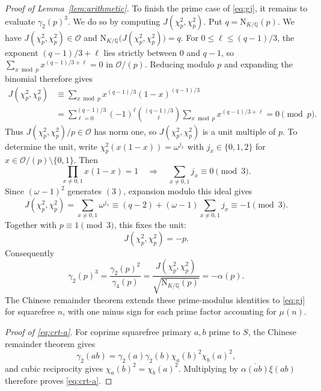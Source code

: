 \documentclass[11pt,a4paper]{article}
\numberwithin{equation}{section}
\numberwithin{figure}{section}
\theoremstyle{definition}
\theoremstyle{remark}
\newcommand{\Q}{\mathbb Q}
\newcommand{\NK}{\mathrm N_{K/\Q}}
\newcommand{\OO}{\mathcal O}
\begin{document}
\begin{proof}[Proof of Lemma~\ref{lem:arithmetic}]
To finish the prime case of \eqref{eq:gj}, it remains to evaluate
$\gamma_2(p)^3$. We do so by computing $J(\chi_p^2,\chi_p^2)$.
Put $q=\NK(p)$. We have $J(\chi_p^2,\chi_p^2)\in\OO$ and $
\NK\bigl(J(\chi_p^2,\chi_p^2)\bigr)=q$.
For $0\le\ell\le(q-1)/3$, the exponent $(q-1)/3+\ell$ lies
strictly between $0$ and $q-1$, so
$\sum_{x\bmod p}x^{(q-1)/3+\ell}=0$ in $\OO/(p)$.
Reducing modulo $p$ and expanding the binomial therefore gives
\[
 \begin{aligned}
 J(\chi_p^2,\chi_p^2)
 &\equiv\sum_{x\bmod p}x^{(q-1)/3}(1-x)^{(q-1)/3}\\
 &=\sum_{\ell=0}^{(q-1)/3}(-1)^\ell\binom{(q-1)/3}{\ell}
       \sum_{x\bmod p}x^{(q-1)/3+\ell}
 =0\pmod p.
 \end{aligned}
\]
 Thus $J(\chi_p^2,\chi_p^2)/p\in\OO$ has norm one,
so $J(\chi_p^2,\chi_p^2)$ is a unit multiple of $p$.
To determine the unit, write
$\chi_p^2(x(1-x))=\omega^{j_x}$ with $j_x\in\{0,1,2\}$
for $x\in\OO/(p)\setminus\{0,1\}$. Then
\[
 \prod_{x\ne0,1}x(1-x)=1
 \quad\Longrightarrow\quad
 \sum_{x\ne0,1}j_x\equiv0\pmod3.
\]
Since $(\omega-1)^2$ generates $(3)$, expansion modulo this ideal gives
\[
 J(\chi_p^2,\chi_p^2) =\sum_{x\ne0,1}\omega^{j_x} \equiv(q-2)+(\omega-1)\sum_{x\ne0,1}j_x \equiv-1\pmod3.
\]
Together with $p\equiv1\pmod3$, this fixes the unit:
\[
 J(\chi_p^2,\chi_p^2)=-p.
\]
Consequently
\[
 \gamma_2(p)^3
 =\frac{\gamma_2(p)^2}{\gamma_4(p)}
 =\frac{J(\chi_p^2,\chi_p^2)}{\sqrt{\NK(p)}}
 =-\alpha(p).
\]
The Chinese remainder theorem extends these prime-modulus identities
to \eqref{eq:gj} for squarefree $n$, with one minus sign for each prime
factor accounting for $\mu(n)$.
\par\noindent\textit{Proof of \eqref{eq:crt-a}.}\quad
For coprime squarefree primary $a,b$ prime to $S$, the Chinese
remainder theorem gives
\[
 \gamma_2(ab)=\gamma_2(a)\gamma_2(b)
                    \chi_a(b)^2\chi_b(a)^2,
\]
and cubic reciprocity gives $\chi_a(b)^2=\chi_b(a)^2$.
Multiplying by $\overline{\alpha(ab)}\xi(ab)$ therefore proves
\eqref{eq:crt-a}.


\end{proof}
\end{document}
